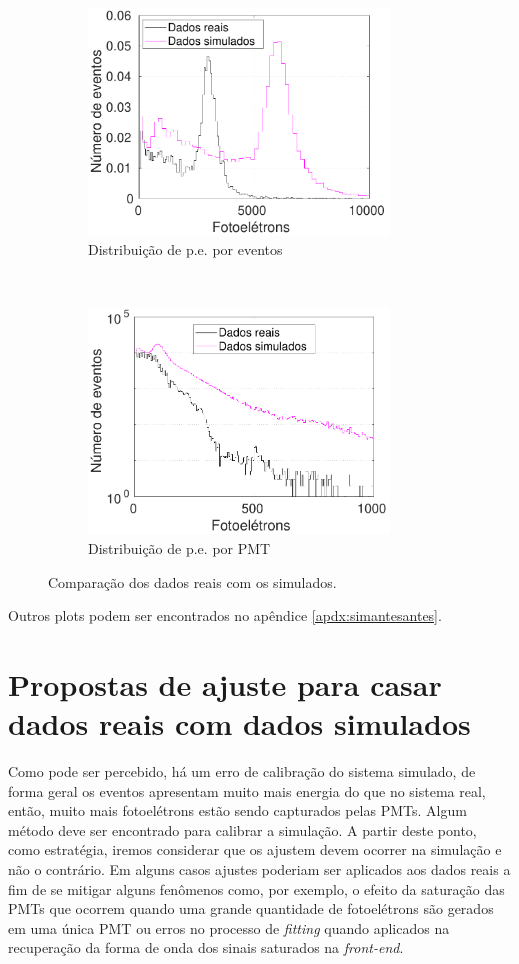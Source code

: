 \begin{figure}[ht]
	\centering
	\begin{subfigure}{0.5\textwidth}
		\centering
	\includegraphics[width=8cm]{textuais/simulacao/figuras/hist_pmt1.pdf}
		\caption{Distribuição de p.e. por eventos}
		\label{fig:a}
	\end{subfigure}%
	~ 
	\begin{subfigure}{0.5\textwidth}
		\centering
	\includegraphics[width=8cm]{textuais/simulacao/figuras/hist_evt1.pdf}
		\caption{Distribuição de p.e. por PMT}
				\label{fig:b}
	\end{subfigure}
	\caption{Comparação dos dados reais com os simulados.}
\end{figure}

Outros plots podem ser encontrados no apêndice \ref{apdx:simantesantes}.

\section{Propostas de ajuste para casar dados reais com dados simulados} \label{sec:bugs}

Como pode ser percebido, há um erro de calibração do sistema simulado, de forma geral os eventos apresentam muito mais energia  do que no sistema real, então, muito mais fotoelétrons estão sendo capturados pelas PMTs. Algum método deve ser encontrado para calibrar a simulação. A partir deste ponto, como estratégia, iremos considerar que os ajustem devem ocorrer na simulação e não o contrário. Em alguns casos ajustes poderiam ser aplicados aos dados reais a fim de se mitigar alguns fenômenos como, por exemplo, o efeito da saturação das PMTs que ocorrem quando uma grande quantidade de fotoelétrons são gerados em uma única PMT ou erros no processo de \textit{fitting} quando aplicados na recuperação da forma de onda dos sinais saturados na \textit{front-end}.

